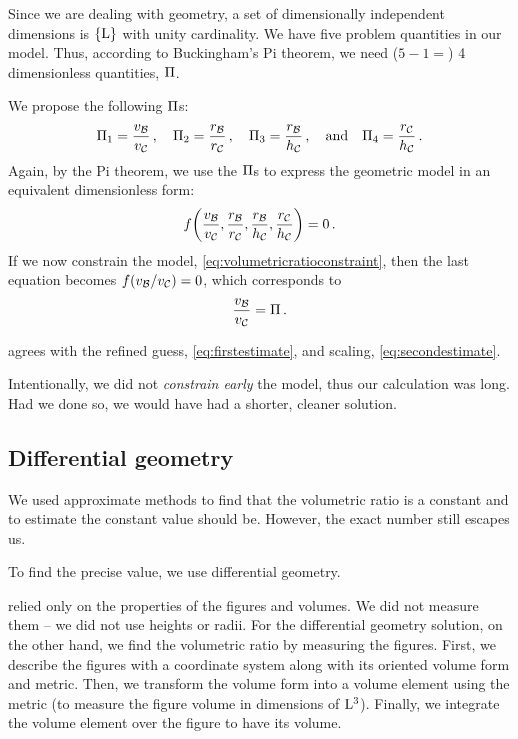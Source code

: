  Since we are dealing with geometry, a set of dimensionally independent dimensions is $\elset{\phdim L}$ with unity cardinality. We have five problem quantities in our model. Thus, according to Buckingham's Pi theorem, we need ($5 - 1 =$) 4 dimensionless quantities, $\kdim$.

 We propose the following $\kdim$s:
%
\begin{equation*}
  \kdim_1 = \dfrac{\vball}{\vcyl}\,,\quad
  \kdim_2 = \dfrac{\rball}{\rcyl}\,,\quad
  \kdim_3 = \dfrac{\rball}{\hcyl}\,,\quad\text{and}\quad
  \kdim_4 = \dfrac{\rcyl}{\hcyl}\,.
\end{equation*}
%
 Again, by the Pi theorem, we use the $\kdim$s to express the geometric model in an equivalent dimensionless form:
%
\begin{equation*}
  f\vat{\dfrac{\vball}{\vcyl}, \dfrac{\rball}{\rcyl}, \dfrac{\rball}{\hcyl}, \dfrac{\rcyl}{\hcyl}} = 0\,.
\end{equation*}
%
 If we now constrain the model, \cref{eq:volumetricratioconstraint}, then the last equation becomes $f\vat{\vball/\vcyl} = 0$, which corresponds to
%
\begin{equation}\label{eq:thirdestimate}
  \dfrac{\vball}{\vcyl} = \kdim\,.
\end{equation}

  agrees with the refined guess, \cref{eq:firstestimate}, and scaling, \cref{eq:secondestimate}.

 Intentionally, we did not \emph{constrain early} the model, thus our calculation was long. Had we done so, we would have had a shorter, cleaner solution.



\subsection{Differential geometry} %
\label{sub:differential_geometry}
%
 We used approximate methods to find that the volumetric ratio is a constant and to estimate the constant value should be. However, the exact number still escapes us.

 To find the precise value, we use differential geometry.

  relied only on the properties of the figures and volumes. We did not measure them -- we did not use heights or radii. For the differential geometry solution, on the other hand, we find the volumetric ratio by measuring the figures. First, we describe the figures with a coordinate system along with its oriented volume form and metric. Then, we transform the volume form into a volume element using the metric (to measure the figure volume in dimensions of $\phdim{L^3}$). Finally, we integrate the volume element over the figure to have its volume.

